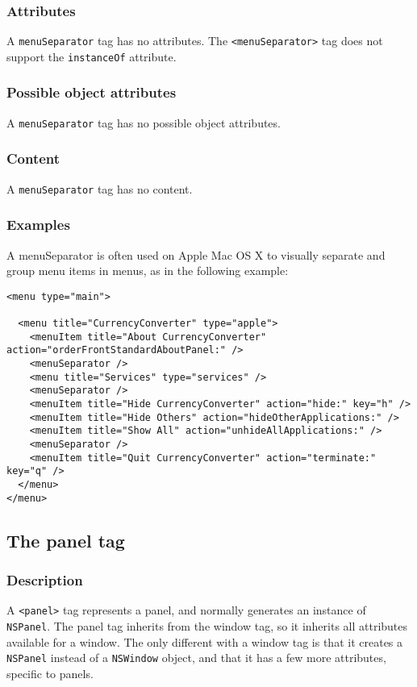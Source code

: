 \subsubsection{Attributes}
A \texttt{menuSeparator} tag has no attributes.  The
\texttt{<menuSeparator>} tag does not support the \texttt{instanceOf}
attribute.

\subsubsection{Possible object attributes}
A \texttt{menuSeparator} tag has no possible object attributes.

\subsubsection{Content}
A \texttt{menuSeparator} tag has no content.

\subsubsection{Examples}
A menuSeparator is often used on Apple Mac OS X to visually separate and
group menu items in menus, as in the following example:
\begin{verbatim}
<menu type="main">

  <menu title="CurrencyConverter" type="apple">
    <menuItem title="About CurrencyConverter" action="orderFrontStandardAboutPanel:" />
    <menuSeparator />
    <menu title="Services" type="services" />
    <menuSeparator />
    <menuItem title="Hide CurrencyConverter" action="hide:" key="h" />
    <menuItem title="Hide Others" action="hideOtherApplications:" />
    <menuItem title="Show All" action="unhideAllApplications:" />
    <menuSeparator />
    <menuItem title="Quit CurrencyConverter" action="terminate:" key="q" />
  </menu>
</menu>
\end{verbatim}

\subsection{The panel tag}

\subsubsection{Description}
A \texttt{<panel>} tag represents a panel, and normally generates an
instance of \texttt{NSPanel}.  The panel tag inherits from the window
tag, so it inherits all attributes available for a window.  The only
different with a window tag is that it creates a \texttt{NSPanel}
instead of a \texttt{NSWindow} object, and that it has a few more
attributes, specific to panels.

